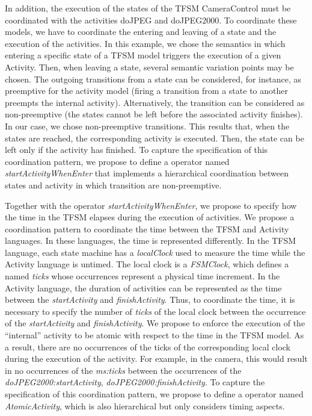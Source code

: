 In addition, the execution of the states of the TFSM CameraControl must be coordinated with the activities doJPEG and doJPEG2000. To coordinate these models, we have to coordinate the entering and leaving of a state and the execution of the activities. In this example, we chose the semantics in which entering a specific state of a TFSM model triggers the execution of a given Activity. Then, when leaving a state, several semantic variation points may be chosen. The outgoing transitions from a state can be considered, for instance, as preemptive for the activity model (\ie firing a transition from a state to another preempts the internal activity). Alternatively, the transition can be considered as non-preemptive (\ie the states cannot be left before the associated activity finishes). In our case, we chose non-preemptive transitions. This results that, when the states are reached, the corresponding activity is executed. Then, the state can be left only if the activity has finished. To capture the specification of this coordination pattern, we propose to define a \bcool operator named \emph{startActivityWhenEnter} that implements a hierarchical coordination between states and activity in which transition are non-preemptive.     

Together with the operator \emph{startActivityWhenEnter}, we propose to specify how the time in the TFSM elapses during the execution of activities. We propose a coordination pattern to coordinate the time between the TFSM and Activity languages. In these languages, the time is represented differently. In the TFSM language, each state machine has a \emph{localClock} used to measure the time while the Activity language is untimed. The local clock is a \emph{FSMClock}, which defines a \dse named \emph{ticks} whose occurrences represent a physical time increment. In the Activity language, the duration of activities can be represented as the time between the \dse \emph{startActivity} and \dse \emph{finishActivity}. Thus, to coordinate the time, it is necessary to specify the number of \emph{ticks} of the local clock between the occurrence of the \dse \emph{startActivity} and \emph{finishActivity}. We propose to enforce the execution of the ``internal'' activity to be atomic with respect to the time in the TFSM model. As a result, there are no occurrences of the \dse ticks of the corresponding local clock during the execution of the activity. For example, in the camera, this would result in no occurrences of the \mse \emph{ms:ticks} between the occurrences of the \mse \emph{doJPEG2000:startActivity}, \emph{doJPEG2000:finishActivity}. To capture the specification of this coordination pattern, we propose to define a \bcool operator named \emph{AtomicActivity}, which is also hierarchical but only considers timing aspects.   


